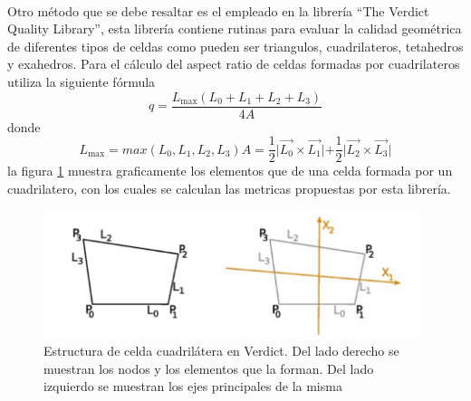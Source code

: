 \documentclass[letterpaper, openright, 12pt]{book}
\begin{document}
    \paragraph*{}
        Otro método que se debe resaltar es el empleado en la librería ``The
        Verdict Quality Library'', esta librería contiene rutinas para evaluar
        la calidad geométrica de diferentes tipos de celdas como pueden ser
        triangulos, cuadrilateros, tetahedros y exahedros. Para el cálculo del
        aspect ratio de celdas formadas por cuadrilateros utiliza la siguiente
        fórmula
        \begin{equation}
            q = \frac{L_{\max}\left( L_0 + L_1 + L_2 + L_3 \right)}{4A}
        \end{equation}
        donde
        \begin{subequations}
            \begin{equation*}
                L_{\max} = max\left( L_0, L_1, L_2, L_3 \right)
            \end{equation*}
            \begin{equation*}
                A = \frac{1}{2} \lvert \vec{L_0} \times \vec{L_1} \lvert
                    + \frac{1}{2} \lvert \vec{L_2} \times \vec{L_3} \lvert
            \end{equation*}
        \end{subequations}
        la figura \ref{aspect_verdict} muestra graficamente los elementos que
        de una celda formada por un cuadrilatero, con los cuales se calculan las
        metricas propuestas por esta librería.

        \begin{figure}[htbp!]
            \centering
            \includegraphics[keepaspectratio, width=110mm]{./Imagenes/aspect_verdict.png}
            \caption[Estrcutura celda cuadrilatera en Verdict]{Estructura de
            celda cuadrilátera en Verdict. Del lado derecho se muestran los
            nodos y los elementos que la forman. Del lado izquierdo se muestran
            los ejes principales de la misma\cite{verdict_quality}}
            \label{aspect_verdict}
        \end{figure}
\end{document}
